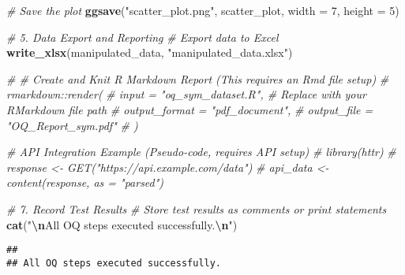 \documentclass[
]{article}
\newenvironment{Shaded}{\begin{snugshade}}{\end{snugshade}}
\newcommand{\AttributeTok}[1]{\textcolor[rgb]{0.13,0.29,0.53}{#1}}
\newcommand{\CommentTok}[1]{\textcolor[rgb]{0.56,0.35,0.01}{\textit{#1}}}
\newcommand{\DecValTok}[1]{\textcolor[rgb]{0.00,0.00,0.81}{#1}}
\newcommand{\FunctionTok}[1]{\textcolor[rgb]{0.13,0.29,0.53}{\textbf{#1}}}
\newcommand{\NormalTok}[1]{#1}
\newcommand{\SpecialCharTok}[1]{\textcolor[rgb]{0.81,0.36,0.00}{\textbf{#1}}}
\newcommand{\StringTok}[1]{\textcolor[rgb]{0.31,0.60,0.02}{#1}}
\begin{document}
\begin{Shaded}
\begin{Highlighting}[]
\CommentTok{\# Save the plot}
\FunctionTok{ggsave}\NormalTok{(}\StringTok{"scatter\_plot.png"}\NormalTok{, scatter\_plot, }\AttributeTok{width =} \DecValTok{7}\NormalTok{, }\AttributeTok{height =} \DecValTok{5}\NormalTok{)}

\CommentTok{\# 5. Data Export and Reporting}
\CommentTok{\# Export data to Excel}
\FunctionTok{write\_xlsx}\NormalTok{(manipulated\_data, }\StringTok{"manipulated\_data.xlsx"}\NormalTok{)}

\CommentTok{\# \# Create and Knit R Markdown Report (This requires an Rmd file setup)}
\CommentTok{\# rmarkdown::render(}
\CommentTok{\#   input = "oq\_sym\_dataset.R",  \# Replace with your RMarkdown file path}
\CommentTok{\#   output\_format = "pdf\_document",}
\CommentTok{\#   output\_file = "OQ\_Report\_sym.pdf"}
\CommentTok{\# )}

\CommentTok{\# API Integration Example (Pseudo{-}code, requires API setup)}
\CommentTok{\# library(httr)}
\CommentTok{\# response \textless{}{-} GET("https://api.example.com/data")}
\CommentTok{\# api\_data \textless{}{-} content(response, as = "parsed")}

\CommentTok{\# 7. Record Test Results}
\CommentTok{\# Store test results as comments or print statements}
\FunctionTok{cat}\NormalTok{(}\StringTok{"}\SpecialCharTok{\textbackslash{}n}\StringTok{All OQ steps executed successfully.}\SpecialCharTok{\textbackslash{}n}\StringTok{"}\NormalTok{)}
\end{Highlighting}
\end{Shaded}

\begin{verbatim}
## 
## All OQ steps executed successfully.
\end{verbatim}
\end{document}
